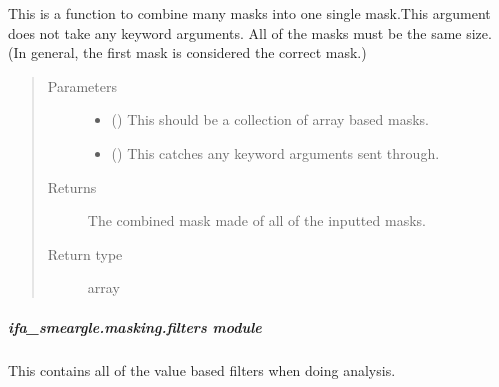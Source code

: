 \documentclass[letterpaper,10pt,english]{sphinxmanual}
\begin{document}
\begin{fulllineitems}
\label{\detokenize{docstrings/ifa_smeargle.masking.base_functions:ifa_smeargle.masking.base_functions.synthesize_masks}}
This is a function to combine many masks into one single
mask.This argument does not take any keyword arguments. All of
the masks must be the same size. (In general, the first mask is
considered the correct mask.)
\begin{quote}\begin{description}
\item[{Parameters}] \leavevmode\begin{itemize}
\item {} 
 () \textendash{} This should be a collection of array based masks.

\item {} 
 () \textendash{} This catches any keyword arguments sent through.

\end{itemize}

\item[{Returns}] \leavevmode
{} \textendash{} The combined mask made of all of the inputted masks.

\item[{Return type}] \leavevmode
array

\end{description}\end{quote}

\end{fulllineitems}



\subparagraph{ifa\_smeargle.masking.filters module}
\label{\detokenize{docstrings/ifa_smeargle.masking.filters:module-ifa_smeargle.masking.filters}}\label{\detokenize{docstrings/ifa_smeargle.masking.filters:ifa-smeargle-masking-filters-module}}\label{\detokenize{docstrings/ifa_smeargle.masking.filters::doc}}
This contains all of the value based filters when doing analysis.
\end{document}
